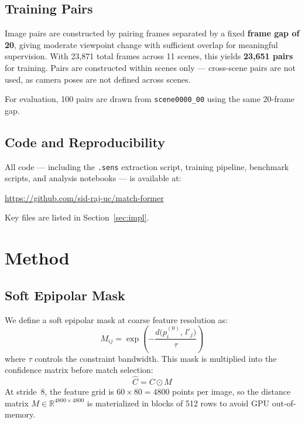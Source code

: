 \documentclass[10pt]{article}
\begin{document}
\subsection{Training Pairs}

Image pairs are constructed by pairing frames separated by a fixed \textbf{frame gap of 20}, giving moderate viewpoint change with sufficient overlap for meaningful supervision. With 23,871 total frames across 11 scenes, this yields \textbf{23,651 pairs} for training. Pairs are constructed within scenes only — cross-scene pairs are not used, as camera poses are not defined across scenes.

For evaluation, 100 pairs are drawn from \texttt{scene0000\_00} using the same 20-frame gap.

\subsection{Code and Reproducibility}

All code — including the \texttt{.sens} extraction script, training pipeline, benchmark scripts, and analysis notebooks — is available at:

\begin{center}
\url{https://github.com/sid-raj-uc/match-former}
\end{center}

Key files are listed in Section~\ref{sec:impl}.

\section{Method}

\subsection{Soft Epipolar Mask}

We define a soft epipolar mask at coarse feature resolution as:
\begin{equation}
    M_{ij} = \exp\!\left(-\frac{d\bigl(p_i^{(0)},\, l'_j\bigr)}{\tau}\right)
\end{equation}
where $\tau$ controls the constraint bandwidth. This mask is multiplied into the confidence matrix before match selection:
\begin{equation}
    \hat{C} = C \odot M
\end{equation}
At stride~8, the feature grid is $60 \times 80 = 4800$ points per image, so the distance matrix $M \in \mathbb{R}^{4800 \times 4800}$ is materialized in blocks of 512 rows to avoid GPU out-of-memory.
\end{document}
